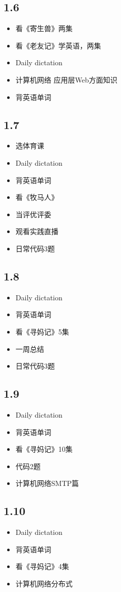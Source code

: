 \documentclass[UTF8]{ctexart}
\begin{document}
\subsection*{1.6}
\begin{itemize}
    \item 看《寄生兽》两集
    \item 看《老友记》学英语，两集
    \item Daily dictation
    \item 计算机网络 应用层Web方面知识
    \item 背英语单词
\end{itemize}
\subsection*{1.7}
\begin{itemize}
    \item 选体育课
    \item Daily dictation
    \item 背英语单词
    \item 看《牧马人》
    \item 当评优评委
    \item 观看实践直播
    \item 日常代码3题
\end{itemize}
\subsection*{1.8}
\begin{itemize}
    \item Daily dictation
    \item 背英语单词
    \item 看《寻妈记》5集
    \item 一周总结
    \item 日常代码3题
\end{itemize}
\subsection*{1.9}
\begin{itemize}
    \item Daily dictation
    \item 背英语单词
    \item 看《寻妈记》10集
    \item 代码2题
    \item 计算机网络SMTP篇
\end{itemize}
\subsection*{1.10}
\begin{itemize}
    \item Daily dictation
    \item 背英语单词
    \item 看《寻妈记》4集
    \item 计算机网络分布式
\end{itemize}
\end{document}
